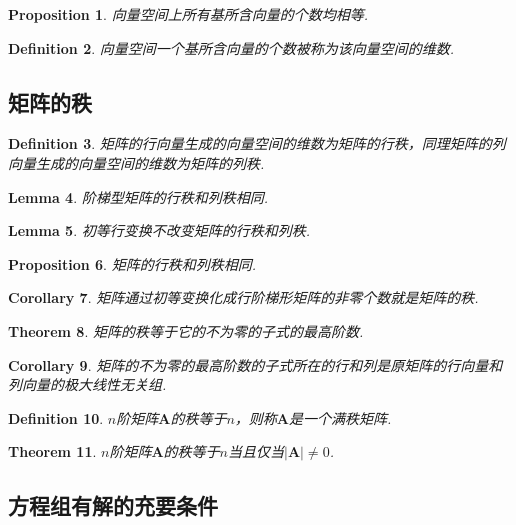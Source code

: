 \documentclass{article}
\newtheorem{theorem}{Theorem}[section]
\newtheorem{lemma}[theorem]{Lemma}
\newtheorem{corollary}[theorem]{Corollary}
\newtheorem{proposition}[theorem]{Proposition}
\newtheorem{definition}[theorem]{Definition}
\newcommand{\mbf}[1]{\bm{#1}}
\begin{document}
\begin{proposition}
\rm 向量空间上所有基所含向量的个数均相等.
\end{proposition}

\begin{definition}
\rm 向量空间一个基所含向量的个数被称为该向量空间的维数.
\end{definition}

\subsection{矩阵的秩}

\begin{definition}
\rm 矩阵的行向量生成的向量空间的维数为矩阵的行秩，同理矩阵的列向量生成的向量空间的维数为矩阵的列秩.
\end{definition}

\begin{lemma}
\rm 阶梯型矩阵的行秩和列秩相同.
\end{lemma}

\begin{lemma}
\rm 初等行变换不改变矩阵的行秩和列秩.
\end{lemma}

\begin{proposition}
\rm 矩阵的行秩和列秩相同.
\end{proposition}

\begin{corollary}
\rm 矩阵通过初等变换化成行阶梯形矩阵的非零个数就是矩阵的秩.
\end{corollary}

\begin{theorem}
\rm 矩阵的秩等于它的不为零的子式的最高阶数.
\end{theorem}


\begin{corollary}
\rm 矩阵的不为零的最高阶数的子式所在的行和列是原矩阵的行向量和列向量的极大线性无关组.
\end{corollary}


\begin{definition}
\rm $n$阶矩阵$\mbf{A}$的秩等于$n$，则称$\mbf{A}$是一个满秩矩阵.
\end{definition}

\begin{theorem}
\rm $n$阶矩阵$\mbf{A}$的秩等于$n$当且仅当$|\mbf{A}| \neq 0$.
\end{theorem}

\subsection{方程组有解的充要条件}
\end{document}

